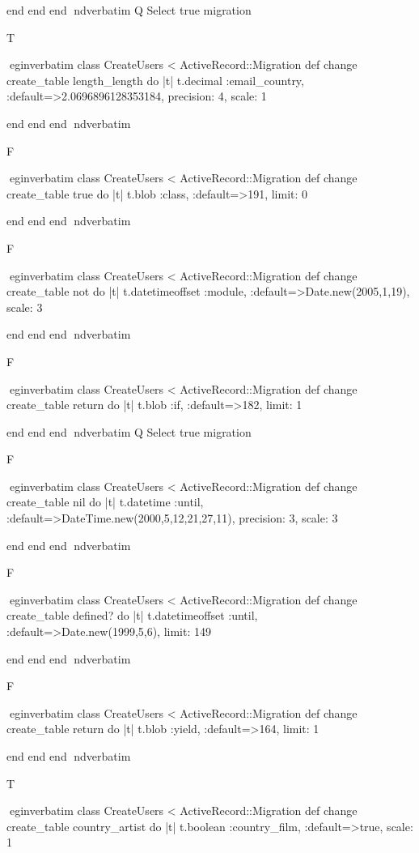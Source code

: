     end 
  end 
end
nd{verbatim}
Q
 Select true migration

T

egin{verbatim}
 class CreateUsers < ActiveRecord::Migration 
  def change 
    create_table length_length do |t| 
      t.decimal :email_country, :default=>2.0696896128353184, precision: 4, scale: 1
    
    end 
  end 
end
nd{verbatim}

F

egin{verbatim}
 class CreateUsers < ActiveRecord::Migration 
  def change 
    create_table true do |t| 
      t.blob :class, :default=>191, limit: 0
    
    end 
  end 
end
nd{verbatim}

F

egin{verbatim}
 class CreateUsers < ActiveRecord::Migration 
  def change 
    create_table not do |t| 
      t.datetimeoffset :module, :default=>Date.new(2005,1,19), scale: 3
    
    end 
  end 
end
nd{verbatim}

F

egin{verbatim}
 class CreateUsers < ActiveRecord::Migration 
  def change 
    create_table return do |t| 
      t.blob :if, :default=>182, limit: 1
    
    end 
  end 
end
nd{verbatim}
Q
 Select true migration

F

egin{verbatim}
 class CreateUsers < ActiveRecord::Migration 
  def change 
    create_table nil do |t| 
      t.datetime :until, :default=>DateTime.new(2000,5,12,21,27,11), precision: 3, scale: 3
    
    end 
  end 
end
nd{verbatim}

F

egin{verbatim}
 class CreateUsers < ActiveRecord::Migration 
  def change 
    create_table defined? do |t| 
      t.datetimeoffset :until, :default=>Date.new(1999,5,6), limit: 149
    
    end 
  end 
end
nd{verbatim}

F

egin{verbatim}
 class CreateUsers < ActiveRecord::Migration 
  def change 
    create_table return do |t| 
      t.blob :yield, :default=>164, limit: 1
    
    end 
  end 
end
nd{verbatim}

T

egin{verbatim}
 class CreateUsers < ActiveRecord::Migration 
  def change 
    create_table country_artist do |t| 
      t.boolean :country_film, :default=>true, scale: 1
    
